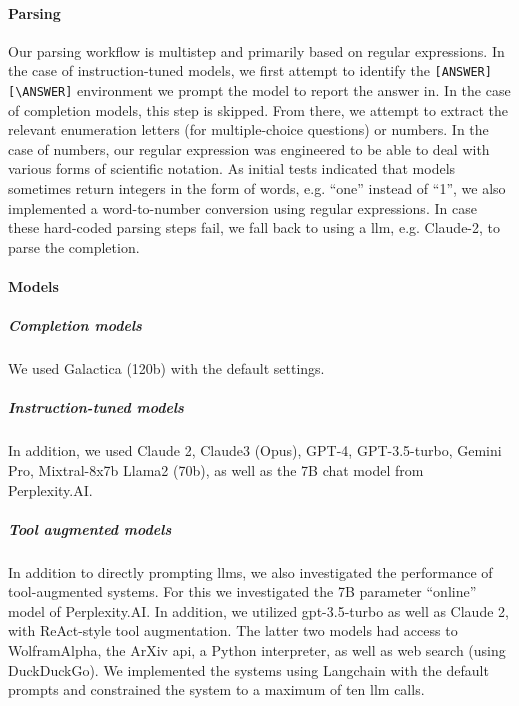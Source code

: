 \documentclass[11pt, oneside]{article}
\begin{document}
\begin{refsection}
\paragraph{Parsing}
Our parsing workflow is multistep and primarily based on regular expressions.
In the case of instruction-tuned models, we first attempt to identify the \texttt{[ANSWER][\textbackslash ANSWER]} environment we prompt the model to report the answer in.
In the case of completion models, this step is skipped. From there, we attempt to extract the relevant enumeration letters (for multiple-choice questions) or numbers.
In the case of numbers, our regular expression was engineered to be able to deal with various forms of scientific notation.
As initial tests indicated that models sometimes return integers in the form of words, e.g. \enquote{one} instead of \enquote{1}, we also implemented a word-to-number conversion using regular expressions.
In case these hard-coded parsing steps fail, we fall back to using a \gls{llm}, e.g. Claude-2, to parse the completion.



\paragraph{Models}
\subparagraph{Completion models}
We used Galactica (120b)\autocite{taylor2022galactica} with the default settings.


\subparagraph{Instruction-tuned models} In addition, we used Claude 2, Claude3 (Opus),\autocite{anthropicClaudeModelFamily2024} GPT-4,\autocite{openai2024gpt4} GPT-3.5-turbo,\autocite{brown2020language} Gemini Pro,\autocite{gemini} Mixtral-8x7b\autocite{jiang2024mixtral} Llama2 (70b),\autocite{touvron2023llama} as well as the 7B chat model from Perplexity.AI.

\subparagraph{Tool augmented models}
In addition to directly prompting \glspl{llm}, we also investigated the performance of tool-augmented systems.
For this we investigated the 7B parameter \enquote{online} model of Perplexity.AI. 
In addition, we utilized gpt-3.5-turbo as well as Claude 2, with ReAct-style tool augmentation.\autocite{yao2023react}
The latter two models had access to WolframAlpha, the ArXiv \gls{api}, a Python interpreter, as well as web search (using DuckDuckGo).
We implemented the systems using Langchain with the default prompts and constrained the system to a maximum of ten \gls{llm} calls.



\end{refsection}
\end{document}
